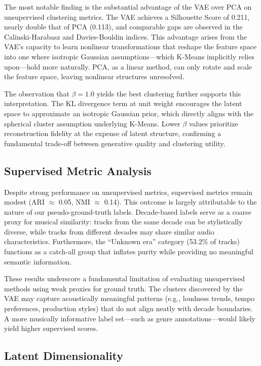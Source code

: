 \documentclass[11pt]{article}
\begin{document}
The most notable finding is the substantial advantage of the VAE over PCA on unsupervised clustering metrics. The VAE achieves a Silhouette Score of 0.211, nearly double that of PCA (0.113), and comparable gaps are observed in the Calinski-Harabasz and Davies-Bouldin indices. This advantage arises from the VAE's capacity to learn nonlinear transformations that reshape the feature space into one where isotropic Gaussian assumptions---which K-Means implicitly relies upon---hold more naturally. PCA, as a linear method, can only rotate and scale the feature space, leaving nonlinear structures unresolved.

The observation that $\beta = 1.0$ yields the best clustering further supports this interpretation. The KL divergence term at unit weight encourages the latent space to approximate an isotropic Gaussian prior, which directly aligns with the spherical cluster assumption underlying K-Means. Lower $\beta$ values prioritize reconstruction fidelity at the expense of latent structure, confirming a fundamental trade-off between generative quality and clustering utility.

\subsection{Supervised Metric Analysis}

Despite strong performance on unsupervised metrics, supervised metrics remain modest (ARI $\approx$ 0.05, NMI $\approx$ 0.14). This outcome is largely attributable to the nature of our pseudo-ground-truth labels. Decade-based labels serve as a coarse proxy for musical similarity: tracks from the same decade can be stylistically diverse, while tracks from different decades may share similar audio characteristics. Furthermore, the ``Unknown era'' category (53.2\% of tracks) functions as a catch-all group that inflates purity while providing no meaningful semantic information.

These results underscore a fundamental limitation of evaluating unsupervised methods using weak proxies for ground truth. The clusters discovered by the VAE may capture acoustically meaningful patterns (e.g., loudness trends, tempo preferences, production styles) that do not align neatly with decade boundaries. A more musically informative label set---such as genre annotations---would likely yield higher supervised scores.

\subsection{Latent Dimensionality}
\end{document}
